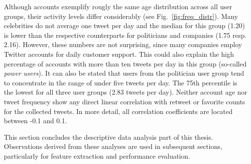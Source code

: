 Although accounts exemplify rougly the same age distribution across all user
groups, their activity levels differ considerably (see Fig.~\ref{fig:freq_distr}).
Many celebrities do not average one tweet per day and the median for this group (1.20)
is lower than the respective counterparts for politicians and companies (1.75 resp. 2.16).
However, these numbers are not surprising, since many companies employ Twitter accounts
for daily customer support.
This could also explain the high percentage of accounts with more than ten tweets
per day in this group (so-called \textit{power users}).
It can also be stated that users from the politician user group tend to concentrate
in the range of under five tweets per day.
The 75th percentile is the lowest for all three user groups (2.83 tweets per day).
Neither account age nor tweet frequency show any direct linear correlation with
retweet or favorite counts for the collected tweets.
In more detail, all correlation coefficients are located between -0.1 and 0.1.

This section concludes the descriptive data analysis part of this thesis.
Observations derived from these analyses are used in subsequent sections,
particularly for feature extraction and performance evaluation.

